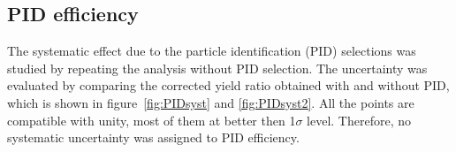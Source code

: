 \subsection{PID efficiency}

The systematic eﬀect due to the particle identification (PID) selections was studied by repeating the analysis without PID selection. The uncertainty was evaluated by comparing the corrected yield ratio obtained with and without PID, which is shown in figure~\ref{fig:PIDsyst} and \ref{fig:PIDsyst2}. All the points are compatible with unity, most of them at better then 1$\sigma$ level. Therefore, no systematic uncertainty was assigned to PID efficiency.




